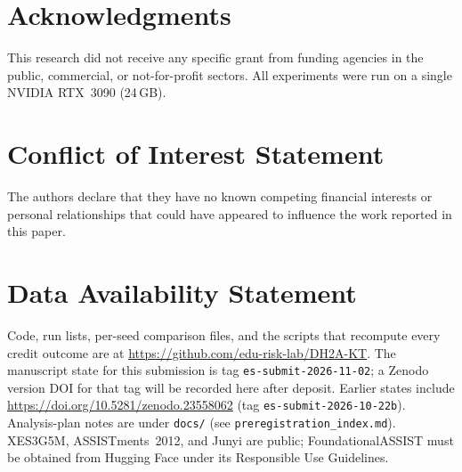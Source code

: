 \documentclass[preprint,12pt]{elsarticle}
\begin{document}
\section*{Acknowledgments}
This research did not receive any specific grant from funding agencies
in the public, commercial, or not-for-profit sectors. All experiments
were run on a single NVIDIA RTX~3090 (24\,GB).

\section*{Conflict of Interest Statement}
The authors declare that they have no known competing financial interests
or personal relationships that could have appeared to influence the work
reported in this paper.

\section*{Data Availability Statement}
Code, run lists, per-seed comparison files, and the scripts that
recompute every credit outcome are at
\url{https://github.com/edu-risk-lab/DH2A-KT}. The manuscript state for
this submission is tag \texttt{es-submit-2026-11-02}; a Zenodo version
DOI for that tag will be recorded here after deposit. Earlier states
include \url{https://doi.org/10.5281/zenodo.23558062} (tag
\texttt{es-submit-2026-10-22b}). Analysis-plan notes are under
\texttt{docs/} (see \texttt{preregistration\_index.md}). XES3G5M,
ASSISTments~2012, and Junyi are public; FoundationalASSIST must be
obtained from Hugging Face under its Responsible Use Guidelines.
\end{document}
